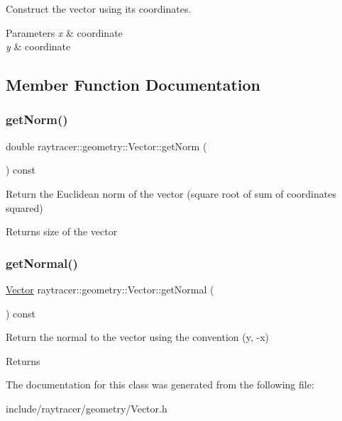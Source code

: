 Construct the vector using its coordinates. 


\begin{DoxyParams}{Parameters}
{\em x} & coordinate \\
\hline
{\em y} & coordinate \\
\hline
\end{DoxyParams}


\subsection{Member Function Documentation}
\mbox{\label{classraytracer_1_1geometry_1_1Vector_ac16dbbd95d3e439c6d4b81bf249d1e83}} 
\subsubsection{\texorpdfstring{get\+Norm()}{getNorm()}}
{\footnotesize\ttfamily double raytracer\+::geometry\+::\+Vector\+::get\+Norm (\begin{DoxyParamCaption}{ }\end{DoxyParamCaption}) const}



Return the Euclidean norm of the vector (square root of sum of coordinates squared) 

\begin{DoxyReturn}{Returns}
size of the vector 
\end{DoxyReturn}
\mbox{\label{classraytracer_1_1geometry_1_1Vector_a49b341cfda70b916ed0c200feb8bad50}} 
\subsubsection{\texorpdfstring{get\+Normal()}{getNormal()}}
{\footnotesize\ttfamily \hyperlink{classraytracer_1_1geometry_1_1Vector}{Vector} raytracer\+::geometry\+::\+Vector\+::get\+Normal (\begin{DoxyParamCaption}{ }\end{DoxyParamCaption}) const\hspace{0.3cm}{\ttfamily [inline]}}



Return the normal to the vector using the convention (y, -\/x) 

\begin{DoxyReturn}{Returns}

\end{DoxyReturn}


The documentation for this class was generated from the following file\+:\begin{DoxyCompactItemize}
\item 
include/raytracer/geometry/Vector.\+h\end{DoxyCompactItemize}
